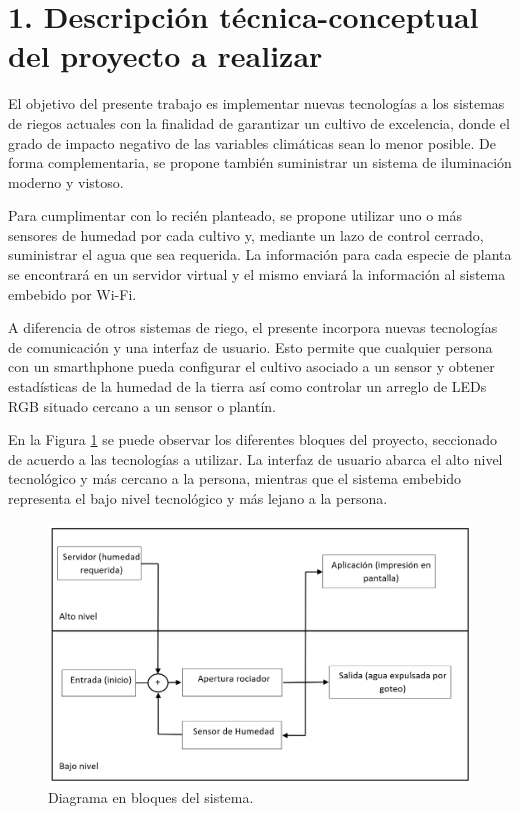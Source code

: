 \documentclass[
11pt, %
]{charter}
\begin{document}
\section{1. Descripción técnica-conceptual del proyecto a realizar}
\label{sec:descripcion}

El objetivo del presente trabajo es implementar nuevas tecnologías a los sistemas de riegos actuales con la finalidad de garantizar un cultivo de excelencia, donde el grado de impacto negativo de las variables climáticas sean lo menor posible. De forma complementaria, se propone también suministrar un sistema de iluminación moderno y vistoso. 

Para cumplimentar con lo recién planteado, se propone utilizar uno o más sensores de humedad por cada cultivo y, mediante un lazo de control cerrado, suministrar el agua que sea requerida. La información para cada especie de planta se encontrará en un servidor virtual y el mismo enviará la información al sistema embebido por Wi-Fi.

A diferencia de otros sistemas de riego, el presente incorpora nuevas tecnologías de comunicación y una interfaz de usuario. Esto permite que cualquier persona con un smarthphone pueda configurar el cultivo asociado a un sensor y obtener estadísticas de la humedad de la tierra así como controlar un arreglo de LEDs RGB situado cercano a un sensor o plantín.

En la Figura \ref{fig:diagBloques} se puede observar los diferentes bloques del proyecto, seccionado de acuerdo a las tecnologías a utilizar. La interfaz de usuario abarca el alto nivel tecnológico y más cercano a la persona, mientras que el sistema embebido representa el bajo nivel tecnológico y más lejano a la persona.

\begin{figure}[htpb]
\centering 
\includegraphics[width=1\textwidth]{./Figuras/digBloq.png}
\caption{Diagrama en bloques del sistema.}
\label{fig:diagBloques}
\end{figure}
\end{document}
